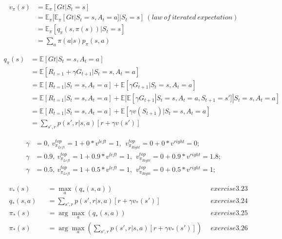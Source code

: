 \documentclass{article}
\begin{document}
\[
  \begin{aligned}
    v_{\pi}(s) &= \mathbb{E}_{\pi} [Gt | S_t = s]\\
    &= \mathbb{E}_{\pi} [ \mathbb{E}_{\pi}[ Gt | S_t=s, A_t = a] | S_t=s] \ (law \ of \ iterated \ expectation) \\
    &= \mathbb{E}_{\pi} [ q_{\pi}(s, \pi(s)) | S_{t}=s]\\
    &= \sum_{a}\pi(a|s) p_{\pi}(s, a)
  \end{aligned}
\]

\[
  \begin{aligned}
    q_{\pi}(s) &= \mathbb{E}[ Gt | S_t=s, A_t = a]\\
    &= \mathbb{E} [ R_{t=1} + \gamma G_{t+1} | S_t=s, A_t = a] \\
    &= \mathbb{E} [ R_{t=1} | S_t=s, A_t = a] + \mathbb{E} [ \gamma G_{t+1} | S_t=s, A_t = a] \\
    &= \mathbb{E} [ R_{t=1} | S_t=s, A_t = a] + \mathbb{E} [ \mathbb{E} [\gamma G_{t+1} | S_t=s, A_t = a, S_{t+1} = s'] | S_t=s, A_t = a] \\
    &= \mathbb{E} [ R_{t=1} | S_t=s, A_t = a] + \mathbb{E} [\gamma v(S_{t+1}) | S_t=s, A_t = a] \\
    &= \sum_{s', r} p(s',r|s,a) [r + \gamma v(s')]
  \end{aligned}
\]

\[
  \begin{aligned}
    \gamma &= 0, \ v_{\pi_{Left}}^{top} = 1 + 0 * v^{left} = 1, \ \ v_{\pi_{Right}}^{top} = 0 + 0 * v^{right} = 0; \\
    \gamma &= 0.9, \ v_{\pi_{Left}}^{top} = 1 + 0.9 * v^{left} = 1, \ \ v_{\pi_{Right}}^{top} = 0 + 0.9 * v^{right} = 1.8; \\
    \gamma &= 0.5, \ v_{\pi_{Left}}^{top} = 1 + 0.5 * v^{left} = 1, \ \ v_{\pi_{Right}}^{top} = 0 + 0.5 * v^{right} = 1;
  \end{aligned}
\]

\[
  \begin{aligned}
    &v_*(s) &&= \max_a (q_*(s, a)) \ \ &exercise3.23 \\
    &q_*(s,a) &&= \sum_{s',r} p(s',r|s,a)[r + \gamma v_*(s')] \ \ &exercise3.24 \\
    &\pi_*(s) &&= \arg\max_a (q_*(s, a))  \ \ &exercise3.25 \\
    &\pi_*(s) &&= \arg\max_a (\sum_{s',r} p(s',r|s,a)[r + \gamma v_*(s')])  \ \ &exercise3.26
  \end{aligned}
\]
\end{document}
